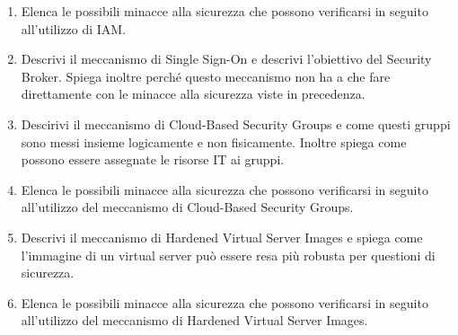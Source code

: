 \begin{enumerate}
    \item Elenca le possibili minacce alla sicurezza che possono verificarsi in seguito all'utilizzo di IAM.
    \item Descrivi il meccanismo di Single Sign-On e descrivi l'obiettivo del Security Broker. Spiega inoltre perché questo meccanismo non ha a che fare direttamente con le minacce alla sicurezza viste in precedenza.
    \item Descirivi il meccanismo di Cloud-Based Security Groups e come questi gruppi sono messi insieme logicamente e non fisicamente. Inoltre spiega come possono essere assegnate le risorse IT ai gruppi.
    \item Elenca le possibili minacce alla sicurezza che possono verificarsi in seguito all'utilizzo del meccanismo di Cloud-Based Security Groups.
    \item Descrivi il meccanismo di Hardened Virtual Server Images e spiega come l'immagine di un virtual server può essere resa più robusta per questioni di sicurezza.
    \item Elenca le possibili minacce alla sicurezza che possono verificarsi in seguito all'utilizzo del meccanismo di Hardened Virtual Server Images.
\end{enumerate}
